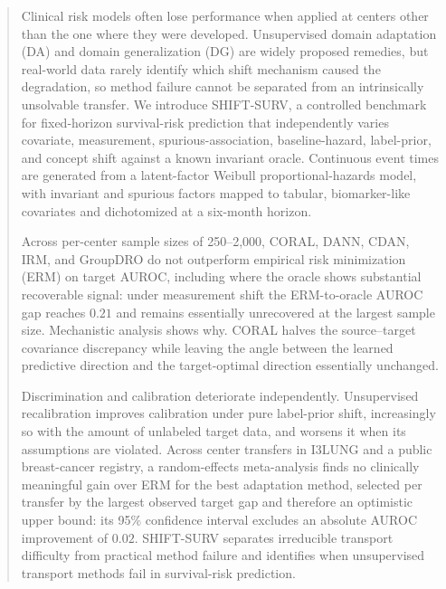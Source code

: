 \begin{abstract}
Clinical risk models often lose performance when applied at centers other than
the one where they were developed. Unsupervised domain adaptation (DA) and
domain generalization (DG) are widely proposed remedies, but real-world data
rarely identify which shift mechanism caused the degradation, so method failure
cannot be separated from an intrinsically unsolvable transfer. We introduce
SHIFT-SURV, a controlled benchmark for fixed-horizon survival-risk prediction
that independently varies covariate, measurement, spurious-association,
baseline-hazard, label-prior, and concept shift against a known invariant
oracle. Continuous event times are generated from a latent-factor Weibull
proportional-hazards model, with invariant and spurious factors mapped to
tabular, biomarker-like covariates and dichotomized at a six-month horizon.

Across per-center sample sizes of 250--2{,}000, CORAL, DANN, CDAN, IRM, and
GroupDRO do not outperform empirical risk minimization (ERM) on target AUROC,
including where the oracle shows substantial recoverable signal: under
measurement shift the ERM-to-oracle AUROC gap reaches $0.21$ and remains
essentially unrecovered at the largest sample size. Mechanistic analysis shows
why. CORAL halves the source--target covariance discrepancy while leaving the
angle between the learned predictive direction and the target-optimal direction
essentially unchanged.

Discrimination and calibration deteriorate independently. Unsupervised
recalibration improves calibration under pure label-prior shift, increasingly so
with the amount of unlabeled target data, and worsens it when its assumptions
are violated. Across center transfers in I3LUNG and a public breast-cancer
registry, a random-effects meta-analysis finds no clinically meaningful gain
over ERM for the best adaptation method, selected per transfer by the largest
observed target gap and therefore an optimistic upper bound: its 95\% confidence
interval excludes an absolute AUROC improvement of $0.02$. SHIFT-SURV separates
irreducible transport difficulty from practical method failure and identifies
when unsupervised transport methods fail in survival-risk prediction.
\end{abstract}
